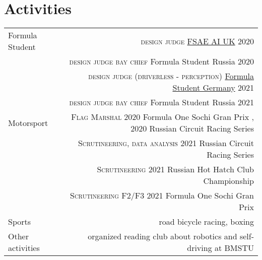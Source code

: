\section*{Activities}
\begin{tabular}{@{}L!{\VRule}R}
    
    Formula Student & {\textsc{design judge}} \href{https://www.imeche.org/events/formula-student/team-information/fs-ai}{FSAE AI UK} 2020 \\
                    & {\textsc{design judge bay chief}} Formula Student Russia 2020 \\
                    & {\textsc{design judge (driverless - perception)}} \href{https://www.formulastudent.de/fsg/}{Formula Student Germany} 2021 \\
                    & {\textsc{design judge bay chief}} Formula Student Russia 2021 \\ 
    Motorsport      & {\textsc{Flag Marshal}} 2020 Formula One Sochi Gran Prix , 2020 Russian Circuit Racing Series \\
                    & {\textsc{Scrutineering, data analysis}} 2021 Russian Circuit Racing Series \\
                    & {\textsc{Scrutineering}} 2021 Russian Hot Hatch Club Championship \\ 
                    & {\textsc{Scrutineering F2/F3}} 2021 Formula One Sochi Gran Prix \\
    Sports   & road bicycle racing, boxing \\
    Other activities & organized reading club about robotics and self-driving at BMSTU
\end{tabular}